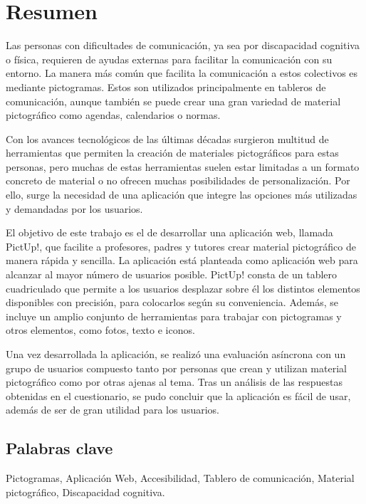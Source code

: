 \chapter*{Resumen}

Las personas con dificultades de comunicación, ya sea por discapacidad cognitiva o física, requieren de ayudas externas para facilitar la comunicación con su entorno. La manera más común que facilita la comunicación a estos colectivos es mediante  pictogramas. Estos son utilizados principalmente en tableros de comunicación, aunque también se puede crear una gran variedad de material pictográfico como agendas, calendarios o normas.

Con los avances tecnológicos de las últimas décadas surgieron multitud de herramientas que permiten la creación de materiales pictográficos para estas personas, pero muchas de estas herramientas suelen estar limitadas a un formato concreto de material o no ofrecen muchas posibilidades de personalización. Por ello, surge la necesidad de una aplicación que integre las opciones más utilizadas y demandadas por los usuarios. 

El objetivo de este trabajo es el de desarrollar una aplicación web, llamada PictUp!, que facilite a profesores, padres y tutores crear material pictográfico de manera rápida y sencilla. La aplicación está planteada como aplicación web para alcanzar al mayor número de usuarios posible. PictUp! consta de un tablero cuadriculado que permite a los usuarios desplazar sobre él los distintos elementos disponibles con precisión, para colocarlos según su conveniencia. Además, se incluye un amplio conjunto de herramientas para trabajar con pictogramas y otros elementos, como fotos, texto e iconos.

Una vez desarrollada la aplicación, se realizó una evaluación asíncrona con un grupo de usuarios compuesto tanto por personas que crean y utilizan material pictográfico como por otras ajenas al tema. Tras un análisis de las respuestas obtenidas en el cuestionario, se pudo concluir que la aplicación es fácil de usar, además de ser de gran utilidad para los usuarios.


\section*{Palabras clave}
   
\noindent Pictogramas, Aplicación Web, Accesibilidad, Tablero de comunicación, Material pictográfico, Discapacidad cognitiva. 

   


